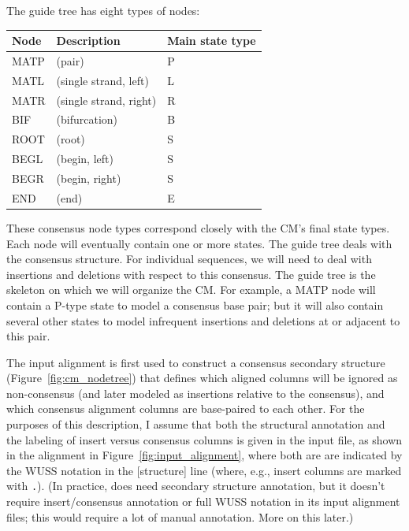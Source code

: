 The guide tree has eight types of nodes:

\vspace{0.5em}
\begin{center}
\begin{tabular}{lll}
Node      & Description        &  Main state type          \\ \hline
MATP  & (pair)                 & P \\
MATL  & (single strand, left)  & L \\
MATR  & (single strand, right) & R \\
BIF   & (bifurcation)          & B \\
ROOT  & (root)                 & S \\
BEGL  & (begin, left)          & S \\
BEGR  & (begin, right)         & S \\
END   & (end)                  & E \\
\end{tabular}
\end{center}
\vspace{0.5em}
 
These consensus node types correspond closely with the CM's final
state types. Each node will eventually contain one or more states. The
guide tree deals with the consensus structure. For individual
sequences, we will need to deal with insertions and deletions with
respect to this consensus. The guide tree is the skeleton on which we
will organize the CM. For example, a MATP node will contain a P-type
state to model a consensus base pair; but it will also contain several
other states to model infrequent insertions and deletions at or
adjacent to this pair.

The input alignment is first used to construct a consensus secondary
structure (Figure~\ref{fig:cm_nodetree}) that defines which aligned
columns will be ignored as non-consensus (and later modeled as
insertions relative to the consensus), and which consensus alignment
columns are base-paired to each other. For the purposes of this
description, I assume that both the structural annotation and the
labeling of insert versus consensus columns is given in the input
file, as shown in the alignment in Figure~\ref{fig:input_alignment},
where both are are indicated by the WUSS notation in the [structure]
line (where, e.g., insert columns are marked with \verb+.+). (In
practice,  does need secondary structure annotation, but
it doesn't require insert/consensus annotation or full WUSS notation
in its input alignment files; this would require a lot of manual
annotation.  More on this later.)

